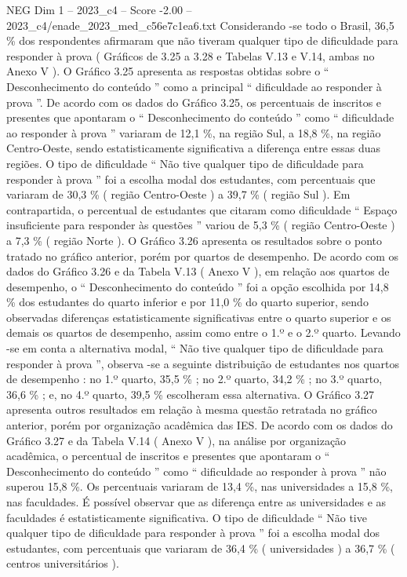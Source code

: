\begin{textsample}{NEG Dim 1 – 2023\_c4 – Score -2.00 – 2023\_c4/enade\_2023\_med\_c56e7c1ea6.txt}
Considerando -se todo o Brasil, 36,5 \% dos respondentes afirmaram que não tiveram qualquer tipo de dificuldade para responder à prova ( Gráficos de 3.25 a 3.28 e Tabelas V.13 e V.14, ambas no Anexo V ).
O Gráfico 3.25 apresenta as respostas obtidas sobre o “ Desconhecimento do conteúdo ” como a principal “ dificuldade ao responder à prova ”.
De acordo com os dados do Gráfico 3.25, os percentuais de inscritos e presentes que apontaram o “ Desconhecimento do conteúdo ” como “ dificuldade ao responder à prova ” variaram de 12,1 \%, na região Sul, a 18,8 \%, na região Centro-Oeste, sendo estatisticamente significativa a diferença entre essas duas regiões.
O tipo de dificuldade “ Não tive qualquer tipo de dificuldade para responder à prova ” foi a escolha modal dos estudantes, com percentuais que variaram de 30,3 \% ( região Centro-Oeste ) a 39,7 \% ( região Sul ).
Em contrapartida, o percentual de estudantes que citaram como dificuldade “ Espaço insuficiente para responder às questões ” variou de 5,3 \% ( região Centro-Oeste ) a 7,3 \% ( região Norte ).
O Gráfico 3.26 apresenta os resultados sobre o ponto tratado no gráfico anterior, porém por quartos de desempenho.
De acordo com os dados do Gráfico 3.26 e da Tabela V.13 ( Anexo V ), em relação aos quartos de desempenho, o “ Desconhecimento do conteúdo ” foi a opção escolhida por 14,8 \% dos estudantes do quarto inferior e por 11,0 \% do quarto superior, sendo observadas diferenças estatisticamente significativas entre o quarto superior e os demais os quartos de desempenho, assim como entre o 1.º e o 2.º quarto.
Levando -se em conta a alternativa modal, “ Não tive qualquer tipo de dificuldade para responder à prova ”, observa -se a seguinte distribuição de estudantes nos quartos de desempenho : no 1.º quarto, 35,5 \% ; no 2.º quarto, 34,2 \% ; no 3.º quarto, 36,6 \% ; e, no 4.º quarto, 39,5 \% escolheram essa alternativa.
O Gráfico 3.27 apresenta outros resultados em relação à mesma questão retratada no gráfico anterior, porém por organização acadêmica das IES.
De acordo com os dados do Gráfico 3.27 e da Tabela V.14 ( Anexo V ), na análise por organização acadêmica, o percentual de inscritos e presentes que apontaram o “ Desconhecimento do conteúdo ” como “ dificuldade ao responder à prova ” não superou 15,8 \%.
Os percentuais variaram de 13,4 \%, nas universidades a 15,8 \%, nas faculdades.
É possível observar que as diferença entre as universidades e as faculdades é estatisticamente significativa.
O tipo de dificuldade “ Não tive qualquer tipo de dificuldade para responder à prova ” foi a escolha modal dos estudantes, com percentuais que variaram de 36,4 \% ( universidades ) a 36,7 \% ( centros universitários ).

\end{textsample}
